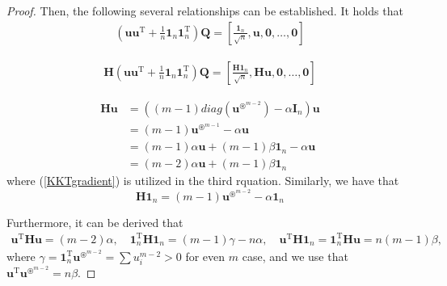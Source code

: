 \begin{proof}

Then,  
the  following  several  relationships  can  be  established.
It  holds  that
\begin{align}\label{uunnQ}
(\mathbf u\mathbf u^{\mathrm T}  
+ 
\frac  1n \mathbf 1_{n}\mathbf 1_{n}^{\mathrm T} )
\mathbf Q
=
[
\frac {\mathbf 1_{n}} { \sqrt{n}} , \mathbf u , \mathbf 0, \dots, \mathbf 0
]
\end{align}

\begin{align}\label{HuunnQ}
\mathbf H
(\mathbf u\mathbf u^{\mathrm T}  
+ 
\frac  1n \mathbf 1_{n}\mathbf 1_{n}^{\mathrm T} )
\mathbf Q
=
[
\frac {\mathbf H \mathbf 1_{n}} { \sqrt{n}} , \mathbf H \mathbf u , \mathbf 0, \dots, \mathbf 0
]
\end{align}

\begin{align}\label{HU} 
\mathbf H
\mathbf u
& =
((m-1) diag (\mathbf u ^{\circledast^{m-2}})
-\alpha \mathbf  I_{n}) \mathbf u
\nonumber  \\
&=
(m-1)  \mathbf u ^{\circledast^{m-1}}-\alpha \mathbf u
\nonumber  \\
& =
(m-1) \alpha  \mathbf u + (m-1) \beta \mathbf  1_{n}-\alpha \mathbf u 
\nonumber  \\
& =
(m-2) \alpha  \mathbf u + (m-1) \beta \mathbf  1_{n}
\end{align}  
where  (\ref{KKTgradient}) is utilized in the third rquation.
Similarly, we have that 
\begin{equation}\label{HLN} 
\mathbf H
\mathbf  1_{n}
=
(m-1)  \mathbf u ^{\circledast^{m-2}}-  \alpha  \mathbf  1_{n}
\end{equation}  

Furthermore, it  can be  derived  that 
\begin{align}\label{UHU} 
\mathbf u^{\mathrm T}
\mathbf H
\mathbf u
=
(m-2) \alpha,  
\quad
\mathbf  1_{n}^{\mathrm T}
\mathbf H
\mathbf  1_{n}
=
(m-1) \gamma
-
n  \alpha  ,
\quad
\mathbf u^{\mathrm T}
\mathbf H
\mathbf 1_{n}
=
\mathbf  1_{n}^{\mathrm T}
\mathbf H
\mathbf  u
=
n(m-1) \beta,
\end{align} 
where
$ \gamma
=
\mathbf 1_{n}^{\mathrm T}  
\mathbf u ^{\circledast^{m-2}}
=
\sum u_{i}^{m-2}
>0
$
for  even  $m$  case, and 
we use 
that 
$ \mathbf u^{\mathrm T}  
\mathbf u ^{\circledast^{m-2}}
=
n \beta
$.


\end{proof}

